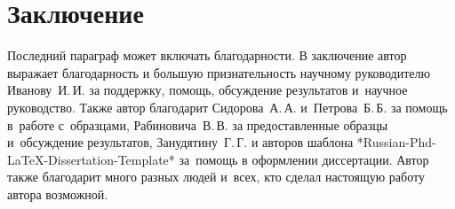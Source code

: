\chapter*{Заключение}                       %










\dotfill

Последний параграф может включать благодарности.  В заключение автор
выражает благодарность и большую признательность научному руководителю
Иванову~И.\,И. за поддержку, помощь, обсуждение результатов и~научное
руководство. Также автор благодарит Сидорова~А.\,А. и~Петрова~Б.\,Б.
за помощь в~работе с~образцами, Рабиновича~В.\,В. за предоставленные
образцы и~обсуждение результатов, Занудятину~Г.\,Г. и авторов шаблона
*Russian-Phd-LaTeX-Dissertation-Template* за~помощь в оформлении
диссертации. Автор также благодарит много разных людей
и~всех, кто сделал настоящую работу автора возможной.


